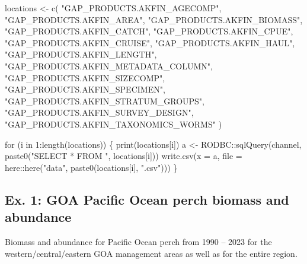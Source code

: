 \documentclass[
  letterpaper,
  oneside,
  open=any]{scrbook}
\newenvironment{Shaded}{\begin{snugshade}}{\end{snugshade}}
\newcommand{\AttributeTok}[1]{\textcolor[rgb]{0.40,0.45,0.13}{#1}}
\newcommand{\ControlFlowTok}[1]{\textcolor[rgb]{0.00,0.23,0.31}{#1}}
\newcommand{\DecValTok}[1]{\textcolor[rgb]{0.68,0.00,0.00}{#1}}
\newcommand{\FunctionTok}[1]{\textcolor[rgb]{0.28,0.35,0.67}{#1}}
\newcommand{\NormalTok}[1]{\textcolor[rgb]{0.00,0.23,0.31}{#1}}
\newcommand{\OtherTok}[1]{\textcolor[rgb]{0.00,0.23,0.31}{#1}}
\newcommand{\SpecialCharTok}[1]{\textcolor[rgb]{0.37,0.37,0.37}{#1}}
\newcommand{\StringTok}[1]{\textcolor[rgb]{0.13,0.47,0.30}{#1}}
\begin{document}
\begin{Shaded}
\begin{Highlighting}[]
\NormalTok{locations }\OtherTok{\textless{}{-}} \FunctionTok{c}\NormalTok{(}
  \StringTok{"GAP\_PRODUCTS.AKFIN\_AGECOMP"}\NormalTok{, }
  \StringTok{"GAP\_PRODUCTS.AKFIN\_AREA"}\NormalTok{, }
  \StringTok{"GAP\_PRODUCTS.AKFIN\_BIOMASS"}\NormalTok{, }
  \StringTok{"GAP\_PRODUCTS.AKFIN\_CATCH"}\NormalTok{, }
  \StringTok{"GAP\_PRODUCTS.AKFIN\_CPUE"}\NormalTok{, }
  \StringTok{"GAP\_PRODUCTS.AKFIN\_CRUISE"}\NormalTok{, }
  \StringTok{"GAP\_PRODUCTS.AKFIN\_HAUL"}\NormalTok{, }
  \StringTok{"GAP\_PRODUCTS.AKFIN\_LENGTH"}\NormalTok{, }
  \StringTok{"GAP\_PRODUCTS.AKFIN\_METADATA\_COLUMN"}\NormalTok{, }
  \StringTok{"GAP\_PRODUCTS.AKFIN\_SIZECOMP"}\NormalTok{, }
  \StringTok{"GAP\_PRODUCTS.AKFIN\_SPECIMEN"}\NormalTok{, }
  \StringTok{"GAP\_PRODUCTS.AKFIN\_STRATUM\_GROUPS"}\NormalTok{, }
  \StringTok{"GAP\_PRODUCTS.AKFIN\_SURVEY\_DESIGN"}\NormalTok{, }
  \StringTok{"GAP\_PRODUCTS.AKFIN\_TAXONOMICS\_WORMS"} 
\NormalTok{)}

\ControlFlowTok{for}\NormalTok{ (i }\ControlFlowTok{in} \DecValTok{1}\SpecialCharTok{:}\FunctionTok{length}\NormalTok{(locations)) \{}
  \FunctionTok{print}\NormalTok{(locations[i])}
\NormalTok{  a }\OtherTok{\textless{}{-}}\NormalTok{ RODBC}\SpecialCharTok{::}\FunctionTok{sqlQuery}\NormalTok{(channel, }\FunctionTok{paste0}\NormalTok{(}\StringTok{"SELECT * FROM "}\NormalTok{, locations[i]))}
  \FunctionTok{write.csv}\NormalTok{(}\AttributeTok{x =}\NormalTok{ a, }\AttributeTok{file =}\NormalTok{ here}\SpecialCharTok{::}\FunctionTok{here}\NormalTok{(}\StringTok{"data"}\NormalTok{, }\FunctionTok{paste0}\NormalTok{(locations[i], }\StringTok{".csv"}\NormalTok{)))}
\NormalTok{\}}
\end{Highlighting}
\end{Shaded}

\hypertarget{ex.-1-goa-pacific-ocean-perch-biomass-and-abundance}{%
\subsection{Ex. 1: GOA Pacific Ocean perch biomass and
abundance}\label{ex.-1-goa-pacific-ocean-perch-biomass-and-abundance}}

Biomass and abundance for Pacific Ocean perch from 1990 -- 2023 for the
western/central/eastern GOA management areas as well as for the entire
region.
\end{document}
